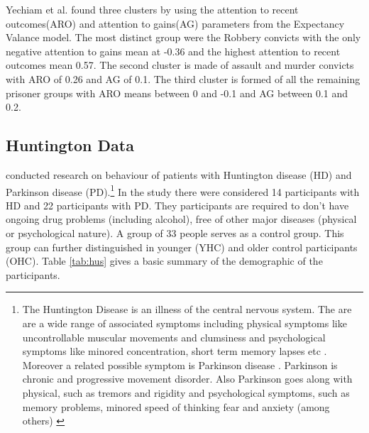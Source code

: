 \documentclass[12pt,a4paper,bibliography=totocnumbered,listof=totocnumbered]{scrartcl}
\begin{document}
Yechiam et al. found three clusters by using the attention to recent outcomes(ARO) and attention to gains(AG) parameters from the Expectancy Valance model. The most distinct group were the Robbery convicts with the only negative attention to gains mean at -0.36 and the highest attention to recent outcomes mean 0.57. The second cluster is made of assault and murder convicts with ARO of 0.26 and AG of 0.1. The third cluster is formed of all the remaining prisoner groups with ARO means between 0 and -0.1 and AG between 0.1 and 0.2.




\subsection{Huntington Data}

\cite{Stout2001} conducted research on behaviour of patients with Huntington disease (HD) and Parkinson disease (PD).\footnote{The Huntington Disease is an illness of the central nervous system. The are are a wide range of associated symptoms including physical symptoms like uncontrollable muscular movements and clumsiness and psychological symptoms like minored concentration, short term memory lapses etc . Moreover a related possible symptom is Parkinson disease \cite{hunt}. Parkinson is chronic and progressive movement  disorder. Also Parkinson goes along with physical, such as tremors and rigidity and psychological symptoms, such as memory problems, minored speed of thinking fear and anxiety (among others) \cite{parc}} 
In the study there were considered 14 participants with HD and 22 participants with PD. They participants are required to don't have ongoing drug problems (including alcohol), free of other major diseases (physical or psychological nature). A group of 33 people serves as a control group. This group can further distinguished in younger (YHC) and older control participants (OHC). Table \ref{tab:hus} gives a basic summary of the demographic of the participants.
\end{document}
